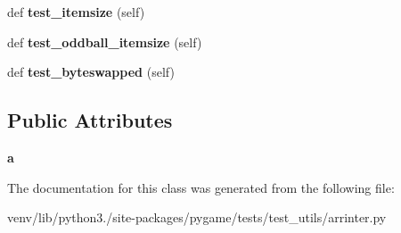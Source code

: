 \begin{DoxyCompactItemize}
def {\bfseries test\+\_\+itemsize} (self)
\item 
\mbox{\label{classpygame_1_1tests_1_1test__utils_1_1arrinter_1_1_array_test_a8ee3cff47909004e2c21ec0dd5bf3e3a}} 
def {\bfseries test\+\_\+oddball\+\_\+itemsize} (self)
\item 
\mbox{\label{classpygame_1_1tests_1_1test__utils_1_1arrinter_1_1_array_test_ab16166f0adaa467f705474718393bd0f}} 
def {\bfseries test\+\_\+byteswapped} (self)
\end{DoxyCompactItemize}
\subsection*{Public Attributes}
\begin{DoxyCompactItemize}
\item 
\mbox{\label{classpygame_1_1tests_1_1test__utils_1_1arrinter_1_1_array_test_a295a08dde80b2fc52fd6f7bb580615fd}} 
{\bfseries a}
\end{DoxyCompactItemize}


The documentation for this class was generated from the following file\+:\begin{DoxyCompactItemize}
\item 
venv/lib/python3./site-\/packages/pygame/tests/test\+\_\+utils/arrinter.\+py\end{DoxyCompactItemize}
